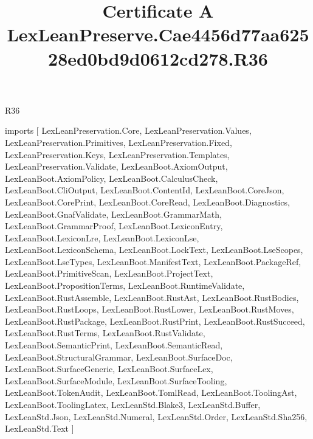 \begin{lexlean}{R36}
\title{Certificate A LexLeanPreserve.Cae4456d77aa62528ed0bd9d0612cd278.R36}
\begin{coremodule}
imports [
  LexLeanPreservation.Core,
  LexLeanPreservation.Values,
  LexLeanPreservation.Primitives,
  LexLeanPreservation.Fixed,
  LexLeanPreservation.Keys,
  LexLeanPreservation.Templates,
  LexLeanPreservation.Validate,
  LexLeanBoot.AxiomOutput,
  LexLeanBoot.AxiomPolicy,
  LexLeanBoot.CalculusCheck,
  LexLeanBoot.CliOutput,
  LexLeanBoot.ContentId,
  LexLeanBoot.CoreJson,
  LexLeanBoot.CorePrint,
  LexLeanBoot.CoreRead,
  LexLeanBoot.Diagnostics,
  LexLeanBoot.GnafValidate,
  LexLeanBoot.GrammarMath,
  LexLeanBoot.GrammarProof,
  LexLeanBoot.LexiconEntry,
  LexLeanBoot.LexiconLre,
  LexLeanBoot.LexiconLse,
  LexLeanBoot.LexiconSchema,
  LexLeanBoot.LockText,
  LexLeanBoot.LseScopes,
  LexLeanBoot.LseTypes,
  LexLeanBoot.ManifestText,
  LexLeanBoot.PackageRef,
  LexLeanBoot.PrimitiveScan,
  LexLeanBoot.ProjectText,
  LexLeanBoot.PropositionTerms,
  LexLeanBoot.RuntimeValidate,
  LexLeanBoot.RustAssemble,
  LexLeanBoot.RustAst,
  LexLeanBoot.RustBodies,
  LexLeanBoot.RustLoops,
  LexLeanBoot.RustLower,
  LexLeanBoot.RustMoves,
  LexLeanBoot.RustPackage,
  LexLeanBoot.RustPrint,
  LexLeanBoot.RustSucceed,
  LexLeanBoot.RustTerms,
  LexLeanBoot.RustValidate,
  LexLeanBoot.SemanticPrint,
  LexLeanBoot.SemanticRead,
  LexLeanBoot.StructuralGrammar,
  LexLeanBoot.SurfaceDoc,
  LexLeanBoot.SurfaceGeneric,
  LexLeanBoot.SurfaceLex,
  LexLeanBoot.SurfaceModule,
  LexLeanBoot.SurfaceTooling,
  LexLeanBoot.TokenAudit,
  LexLeanBoot.TomlRead,
  LexLeanBoot.ToolingAst,
  LexLeanBoot.ToolingLatex,
  LexLeanStd.Blake3,
  LexLeanStd.Buffer,
  LexLeanStd.Json,
  LexLeanStd.Numeral,
  LexLeanStd.Order,
  LexLeanStd.Sha256,
  LexLeanStd.Text
]


\end{coremodule}
\end{lexlean}
